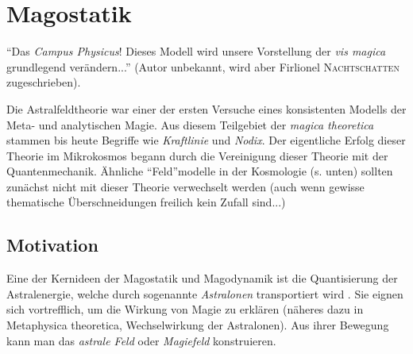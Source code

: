 \chapter[tocentry=Magostatik, head=Magostatik]{Magostatik}
"`Das \emph{Campus Physicus}! Dieses Modell wird unsere Vorstellung der \emph{vis magica} grundlegend verändern..."' (Autor unbekannt, wird aber Firlionel \textsc{Nachtschatten} zugeschrieben).

Die Astralfeldtheorie war einer der ersten Versuche eines konsistenten Modells der Meta- und analytischen Magie. Aus diesem Teilgebiet der \emph{magica theoretica} stammen bis heute Begriffe wie \emph{Kraftlinie} und \emph{Nodix}. Der eigentliche Erfolg dieser Theorie im Mikrokosmos begann durch die Vereinigung dieser Theorie mit der Quantenmechanik.  Ähnliche "`Feld"'modelle in der Kosmologie (s. unten) sollten zunächst nicht mit dieser Theorie verwechselt werden (auch wenn gewisse thematische Überschneidungen freilich kein Zufall sind...)

\section{Motivation}
Eine der Kernideen der Magostatik und Magodynamik ist die Quantisierung der Astralenergie, welche durch sogenannte \emph{Astralonen} transportiert wird \cite{quanten}. Sie eignen sich vortrefflich, um die Wirkung von Magie zu erklären (näheres dazu in Metaphysica theoretica, Wechselwirkung der Astralonen). Aus ihrer Bewegung kann man das \emph{astrale Feld} oder \emph{Magiefeld} konstruieren.

